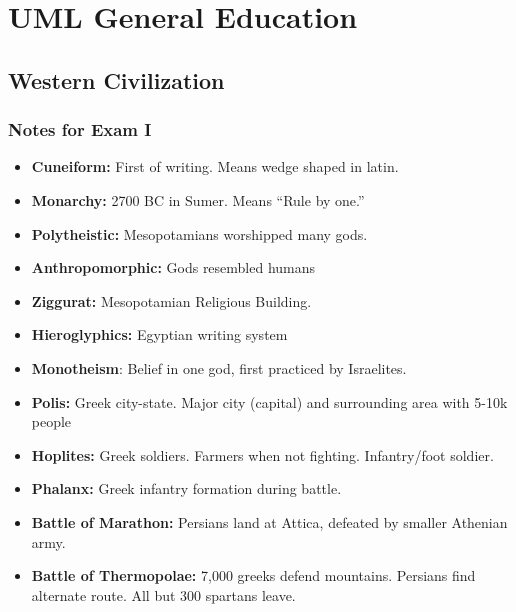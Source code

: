 \documentclass[crop=false,class=book]{standalone}
\begin{document}
\chapter{UML General Education}
    \section{Western Civilization}
        \subsection{Notes for Exam I}
            \begin{itemize}[noitemsep]
                \item \textbf{Cuneiform:}
                    First of writing. Means wedge shaped in latin.
                \item \textbf{Monarchy:}
                    2700 BC in Sumer. Means ``Rule by one.''
                \item \textbf{Polytheistic:}
                    Mesopotamians worshipped many gods.
                \item \textbf{Anthropomorphic:}
                    Gods resembled humans
                \item \textbf{Ziggurat:}
                    Mesopotamian Religious Building.
                \item \textbf{Hieroglyphics:}
                    Egyptian writing system
                \item \textbf{Monotheism}:
                    Belief in one god, first practiced
                    by Israelites.
                \item \textbf{Polis:}
                    Greek city-state. Major city (capital) and
                    surrounding area with 5-10k people
                \item \textbf{Hoplites:}
                    Greek soldiers. Farmers when not fighting.
                    Infantry/foot soldier.
                \item \textbf{Phalanx:}
                    Greek infantry formation during battle.
                \item \textbf{Battle of Marathon:}
                    Persians land at Attica, defeated by smaller
                    Athenian army.
                \item \textbf{Battle of Thermopolae:}
                    7,000 greeks defend mountains. Persians find
                    alternate route. All but 300 spartans leave.

\end{itemize}
\end{document}
